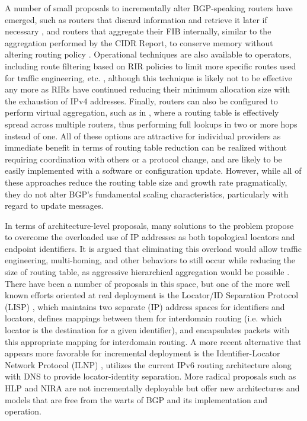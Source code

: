 A number of small proposals to incrementally alter BGP-speaking routers have
emerged, such as routers that discard information and retrieve it later if
necessary \cite{Karpilovsky:2006ys}, and routers that aggregate their FIB
internally, similar to the aggregation performed by the CIDR Report, to
conserve memory without altering routing policy \cite{Zhao:2010vn}. Operational
techniques are also available to operators, including route filtering based on
RIR policies to limit more specific routes used for traffic engineering, etc.
\cite{Bellovin:2001qf}, although this technique is likely not to be effective
any more as RIRs have continued reducing their minimum allocation size with the
exhaustion of IPv4 addresses. Finally, routers can also be configured to
perform virtual aggregation, such as in \cite{Ballani:2009tg}, where a routing
table is effectively spread across multiple routers, thus performing full
lookups in two or more hops instead of one. All of these options are attractive
for individual providers as immediate benefit in terms of routing table
reduction can be realized without requiring coordination with others or a
protocol change, and are likely to be easily implemented with a software or
configuration update. However, while all of these approaches reduce the
routing table size and growth rate pragmatically, they do not alter BGP's
fundamental scaling characteristics, particularly with regard to update
messages.

In terms of architecture-level proposals, many solutions to the problem propose
to overcome the overloaded use of IP addresses as both topological locators and
endpoint identifiers. It is argued that eliminating this overload would allow
traffic engineering, multi-homing, and other behaviors to still occur while
reducing the size of routing table, as aggressive hierarchical aggregation
would be possible \cite{Quoitin:2007uq}. There have been a number of proposals
in this space, but one of the more well known efforts oriented at real
deployment is the Locator/ID Separation Protocol (LISP) \cite{lisp-id}, which
maintains two separate (IP) address spaces for identifiers and locators,
defines mappings between them for interdomain routing (i.e. which locator is
the destination for a given identifier), and encapsulates packets with this
appropriate mapping for interdomain routing. A more recent alternative that
appears more favorable for incremental deployment is the Identifier-Locator
Network Protocol (ILNP) \cite{Atkinson:2010zr}, utilizes the current IPv6
routing architecture along with DNS to provide locator-identity separation.
More radical proposals such as HLP \cite{Subramanian:2005ve} and NIRA
\cite{Yang:2007cr} are not incrementally deployable but offer new architectures
and models that are free from the warts of BGP and its implementation and
operation.

